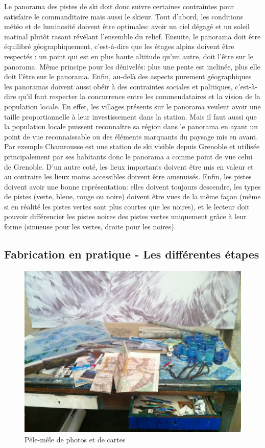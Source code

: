 Le panorama des pistes de ski doit donc suivre certaines contraintes pour satisfaire le commanditaire mais aussi le skieur. Tout d'abord, les conditions météo et de luminosité doivent être optimales: avoir un ciel dégagé et un soleil matinal plutôt rasant révélant l'ensemble du relief. Ensuite, le panorama doit être équilibré géographiquement, c'est-à-dire que les étages alpins doivent être respectés : un point qui est en plus haute altitude qu'un autre, doit l'être sur le panorama. Même principe pour les dénivelés: plus une pente est inclinée, plus elle doit l'être sur le panorama. Enfin, au-delà des aspects purement géographiques les panoramas doivent aussi obéir à des contraintes sociales et politiques, c'est-à-dire qu'il faut respecter la concurrence entre les commendataires et la vision de la population locale. En effet, les villages présents sur le panorama veulent avoir une taille proportionnelle à leur investissement dans la station. Mais il faut aussi que la population locale puissent reconnaître sa région dans le panorama en ayant un point de vue reconnaissable ou des éléments marquants du paysage mis en avant. Par exemple Chamrousse est une station de ski visible depuis Grenoble et utilisée principalement par ses habitants donc le panorama a comme point de vue celui de Grenoble. 
D'un autre coté, les lieux importants doivent être mis en valeur et au contraire les lieux moins accessibles doivent être amenuisés. Enfin, les pistes doivent avoir une bonne représentation: elles doivent toujours descendre, les types de pistes (verte, bleue, rouge ou noire) doivent être vues de la même façon (même si en réalité les pistes vertes sont plus courtes que les noires), et le lecteur doit pouvoir différencier les pistes noires des pistes vertes uniquement grâce à leur forme (sinueuse pour les vertes, droite pour les noires).


\subsection{Fabrication en pratique - Les différentes étapes}

\begin{figure}[h!]
\centering
 \includegraphics[width=0.5\linewidth]{novat/PN_Modelisation.jpg}
 \caption{\label{fig:Model} Pêle-mêle de photos et de cartes}
\end{figure}


